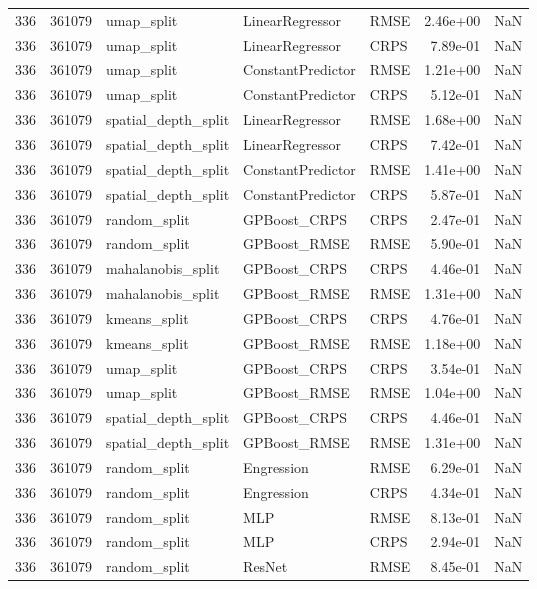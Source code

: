 \begin{tabular}{rrlllrr}
336 & 361079 & umap\_split & LinearRegressor & RMSE & 2.46e+00 & NaN \\
336 & 361079 & umap\_split & LinearRegressor & CRPS & 7.89e-01 & NaN \\
336 & 361079 & umap\_split & ConstantPredictor & RMSE & 1.21e+00 & NaN \\
336 & 361079 & umap\_split & ConstantPredictor & CRPS & 5.12e-01 & NaN \\
336 & 361079 & spatial\_depth\_split & LinearRegressor & RMSE & 1.68e+00 & NaN \\
336 & 361079 & spatial\_depth\_split & LinearRegressor & CRPS & 7.42e-01 & NaN \\
336 & 361079 & spatial\_depth\_split & ConstantPredictor & RMSE & 1.41e+00 & NaN \\
336 & 361079 & spatial\_depth\_split & ConstantPredictor & CRPS & 5.87e-01 & NaN \\
336 & 361079 & random\_split & GPBoost\_CRPS & CRPS & 2.47e-01 & NaN \\
336 & 361079 & random\_split & GPBoost\_RMSE & RMSE & 5.90e-01 & NaN \\
336 & 361079 & mahalanobis\_split & GPBoost\_CRPS & CRPS & 4.46e-01 & NaN \\
336 & 361079 & mahalanobis\_split & GPBoost\_RMSE & RMSE & 1.31e+00 & NaN \\
336 & 361079 & kmeans\_split & GPBoost\_CRPS & CRPS & 4.76e-01 & NaN \\
336 & 361079 & kmeans\_split & GPBoost\_RMSE & RMSE & 1.18e+00 & NaN \\
336 & 361079 & umap\_split & GPBoost\_CRPS & CRPS & 3.54e-01 & NaN \\
336 & 361079 & umap\_split & GPBoost\_RMSE & RMSE & 1.04e+00 & NaN \\
336 & 361079 & spatial\_depth\_split & GPBoost\_CRPS & CRPS & 4.46e-01 & NaN \\
336 & 361079 & spatial\_depth\_split & GPBoost\_RMSE & RMSE & 1.31e+00 & NaN \\
336 & 361079 & random\_split & Engression & RMSE & 6.29e-01 & NaN \\
336 & 361079 & random\_split & Engression & CRPS & 4.34e-01 & NaN \\
336 & 361079 & random\_split & MLP & RMSE & 8.13e-01 & NaN \\
336 & 361079 & random\_split & MLP & CRPS & 2.94e-01 & NaN \\
336 & 361079 & random\_split & ResNet & RMSE & 8.45e-01 & NaN \\

\end{tabular}
